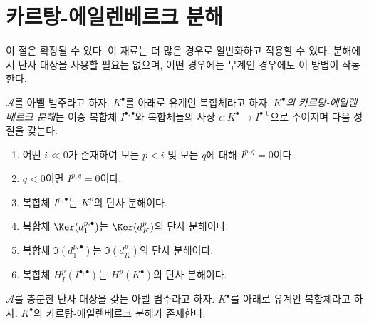 \section{카르탕-에일렌베르크 분해}
\label{section-cartan-eilenberg}

\noindent
이 절은 확장될 수 있다. 이 재료는 더 많은 경우로 일반화하고 적용할 수
있다. 분해에서 단사 대상을 사용할 필요는 없으며, 어떤 경우에는 무계인
경우에도 이 방법이 작동한다.

\begin{definition}
\label{definition-cartan-eilenberg}
$\mathcal{A}$를 아벨 범주라고 하자.
$K^\bullet$를 아래로 유계인 복합체라고 하자.
{\it $K^\bullet$의 카르탕-에일렌베르크 분해}는 이중 복합체
$I^{\bullet, \bullet}$와 복합체들의 사상
$\epsilon : K^\bullet \to I^{\bullet, 0}$으로 주어지며 다음 성질을 갖는다.
\begin{enumerate}
\item 어떤 $i \ll 0$가 존재하여 모든 $p < i$ 및 모든 $q$에 대해
$I^{p, q} = 0$이다.
\item $q < 0$이면 $I^{p, q} = 0$이다.
\item 복합체 $I^{p, \bullet}$는 $K^p$의 단사 분해이다.
\item 복합체 $\Ker(d_1^{p, \bullet})$는 $\Ker(d_K^p)$의 단사 분해이다.
\item 복합체 $\Im(d_1^{p, \bullet})$는 $\Im(d_K^p)$의 단사 분해이다.
\item 복합체 $H^p_I(I^{\bullet, \bullet})$는 $H^p(K^\bullet)$의
단사 분해이다.
\end{enumerate}
\end{definition}

\begin{lemma}
\label{lemma-cartan-eilenberg}
$\mathcal{A}$를 충분한 단사 대상을 갖는 아벨 범주라고 하자.
$K^\bullet$를 아래로 유계인 복합체라고 하자.
$K^\bullet$의 카르탕-에일렌베르크 분해가 존재한다.
\end{lemma}

